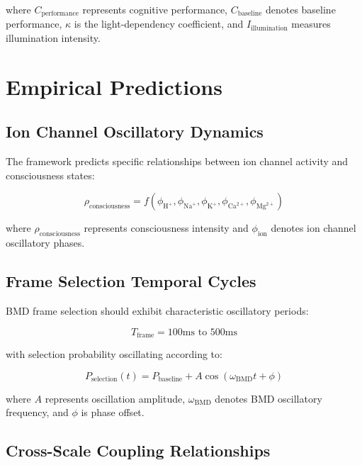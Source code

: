 \documentclass[12pt,a4paper]{article}
\begin{document}
where $C_{\text{performance}}$ represents cognitive performance, $C_{\text{baseline}}$ denotes baseline performance, $\kappa$ is the light-dependency coefficient, and $I_{\text{illumination}}$ measures illumination intensity.

\section{Empirical Predictions}

\subsection{Ion Channel Oscillatory Dynamics}

The framework predicts specific relationships between ion channel activity and consciousness states:

\begin{equation}
\rho_{\text{consciousness}} = f(\phi_{\text{H}^+}, \phi_{\text{Na}^+}, \phi_{\text{K}^+}, \phi_{\text{Ca}^{2+}}, \phi_{\text{Mg}^{2+}})
\end{equation}

where $\rho_{\text{consciousness}}$ represents consciousness intensity and $\phi_{\text{ion}}$ denotes ion channel oscillatory phases.

\subsection{Frame Selection Temporal Cycles}

BMD frame selection should exhibit characteristic oscillatory periods:

\begin{equation}
T_{\text{frame}} = 100\text{ms} \text{ to } 500\text{ms}
\end{equation}

with selection probability oscillating according to:

\begin{equation}
P_{\text{selection}}(t) = P_{\text{baseline}} + A \cos(\omega_{\text{BMD}} t + \phi)
\end{equation}

where $A$ represents oscillation amplitude, $\omega_{\text{BMD}}$ denotes BMD oscillatory frequency, and $\phi$ is phase offset.

\subsection{Cross-Scale Coupling Relationships}
\end{document}
